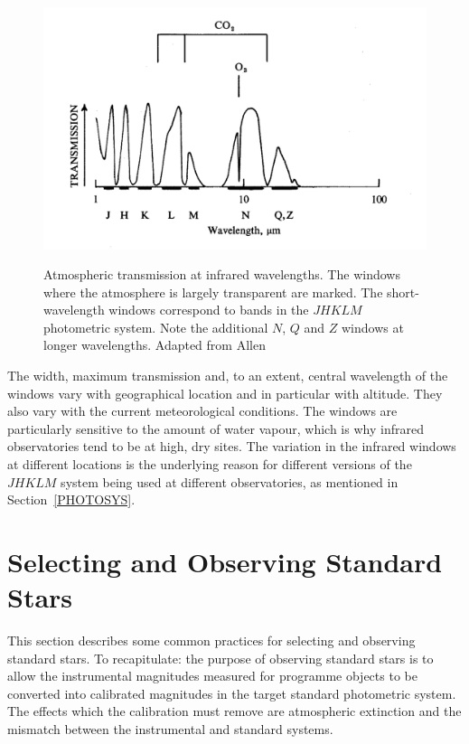 \documentclass[twoside,11pt,nolof]{starlink}
\begin{document}
\begin{figure}[htbp]
   \centering
   \includegraphics[totalheight=3.5in]{sc6_irwindows}
   \begin{quote}
   \caption[Atmospheric transmission at infrared wavelengths]
    {Atmospheric transmission at infrared wavelengths.  The windows where
    the atmosphere is largely transparent are marked.  The short-wavelength
    windows correspond to bands in the $JHKLM$ photometric system.  Note
    the additional $N$, $Q$ and $Z$ windows at longer wavelengths.  Adapted
    from Allen\cite{ALLEN75}
   \label{IRWINDOWS} }
   \end{quote}
\end{figure}

The width, maximum transmission and, to an extent, central wavelength
of the windows vary with geographical location and in particular with
altitude.  They also vary with the current meteorological conditions.
The windows are particularly sensitive to the amount of water
vapour, which is why infrared observatories tend to be at high, dry sites.
The variation in the infrared windows at different locations is the
underlying reason for different versions of the $JHKLM$ system being
used at different observatories, as mentioned in Section~\ref{PHOTOSYS}.


\section{\label{SELOBS_STANDARD}Selecting and
Observing Standard Stars}

This section describes some common practices for selecting and observing
standard stars.  To recapitulate: the purpose of observing standard stars
is to allow the instrumental magnitudes measured for programme objects to
be converted into calibrated magnitudes in the target standard photometric
system.  The effects which the calibration must remove are atmospheric
extinction and the mismatch between the instrumental and standard systems.
\end{document}
